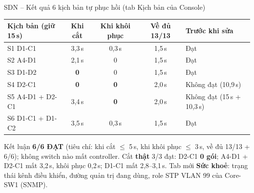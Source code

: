 \documentclass[aspectratio=169, 10pt]{beamer}
\begin{document}
\begin{frame}{SDN -- Kết quả 6 kịch bản tự phục hồi (tab Kịch bản của Console)}
    \centering
    \footnotesize
    \begin{tabular}{@{}lcccl@{}}
        \toprule
        \textbf{Kịch bản (giữ 15\,s)} & \textbf{Khi cắt} & \textbf{Khi khôi phục} & \textbf{Về đủ 13/13} & \textbf{Trước khi sửa} \\
        \midrule
        S1 D1-C1           & 3,3\,s & 0,3\,s & 1,5\,s & Đạt \\
        S2 A4-D1           & 2,1\,s & 0      & 1,5\,s & Đạt \\
        S3 D1-D2           & \textbf{0} & 0  & 1,5\,s & Đạt \\
        S4 D2-C1           & \textbf{0} & \textbf{0} & 2,0\,s & \alert{Không đạt (10,9\,s)} \\
        S5 A4-D1 + D2-C1   & 3,4\,s & \textbf{0} & 2,0\,s & \alert{Không đạt (15\,s + 10,3\,s)} \\
        S6 D1-C1 + D1-C2   & 3,5\,s & 0,3\,s & 1,5\,s & Đạt \\
        \bottomrule
    \end{tabular}
    \vspace{0.25cm}

    \begin{block}{Kết luận}
        \small
        \textbf{6/6 ĐẠT} (tiêu chí: khi cắt $\le$ 5\,s, khi khôi phục $\le$ 3\,s, về đủ 13/13 + 6/6); không switch nào mất controller.
        Cắt \textbf{thật} 3/3 đạt: D2-C1 \textbf{0 gói}; A4-D1 + D2-C1 mất 3,2\,s, khôi phục 0,2\,s; D1-C1 mất 2,8--3,1\,s.
        Tab mới \textbf{Sức khoẻ}: trạng thái kênh điều khiển, đường quản trị đang dùng, role STP VLAN 99 của Core-SW1 (SNMP).
    \end{block}
\end{frame}
\end{document}
